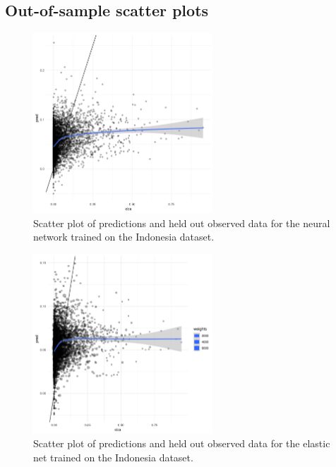 \documentclass[review]{elsarticle}
\begin{document}
\clearpage
\subsection{Out-of-sample scatter plots}


\begin{figure}[h!]
  \centering
  \includegraphics[width=0.6\textwidth]{figs/SI/nnet_obspred_idn.png}
\caption{
  Scatter plot of predictions and held out observed data for the neural network trained on the Indonesia dataset.
}

\end{figure}



\begin{figure}[h!]
  \centering
  \includegraphics[width=0.6\textwidth]{figs/SI/enet_obspred_idn.png}
\caption{
  Scatter plot of predictions and held out observed data for the elastic net trained on the Indonesia dataset.
}

\end{figure}
\end{document}

